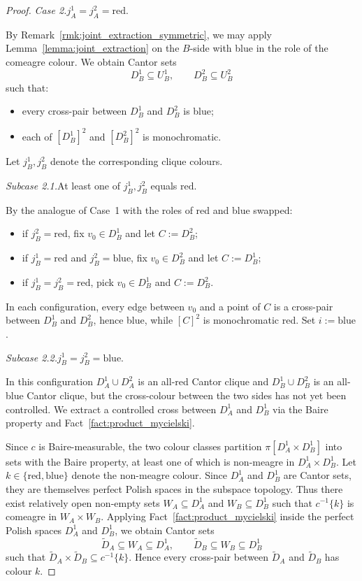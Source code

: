 \begin{proof}
    \medskip\noindent\textit{Case 2.}\quad $j_A^1=j_A^2=\mathrm{red}$.
    
    By Remark~\ref{rmk:joint_extraction_symmetric}, we may apply Lemma~\ref{lemma:joint_extraction} on the $B$-side with blue in the role of the comeagre colour.
    We obtain Cantor sets $$D_B^1\subseteq U_B^1,\qquad D_B^2\subseteq U_B^2$$ such that:
    \begin{itemize}
        \item every cross-pair between $D_B^1$ and $D_B^2$ is blue;
        \item each of $[D_B^1]^2$ and $[D_B^2]^2$ is monochromatic.
    \end{itemize}
    Let $j_B^1,j_B^2$ denote the corresponding clique colours.
    
    \medskip\noindent\textit{Subcase 2.1.}\quad At least one of $j_B^1,j_B^2$ equals $\mathrm{red}$.
    
    By the analogue of Case~1 with the roles of red and blue swapped:
    \begin{itemize}
        \item if $j_B^2=\mathrm{red}$, fix $v_0\in D_B^1$ and let $C:=D_B^2$;
        \item if $j_B^1=\mathrm{red}$ and $j_B^2=\mathrm{blue}$, fix $v_0\in D_B^2$ and let $C:=D_B^1$;
        \item if $j_B^1=j_B^2=\mathrm{red}$, pick $v_0\in D_B^1$ and $C:=D_B^2$.
    \end{itemize}
    In each configuration, every edge between $v_0$ and a point of $C$ is a cross-pair between $D_B^1$ and $D_B^2$, hence blue, while $[C]^2$ is monochromatic red.
    Set $i:=\mathrm{blue}$.
 
    \medskip\noindent\textit{Subcase 2.2.}\quad $j_B^1=j_B^2=\mathrm{blue}$.
    
    In this configuration $D_A^1\cup D_A^2$ is an all-red Cantor clique and $D_B^1\cup D_B^2$ is an all-blue Cantor clique, but the cross-colour between the two sides has not yet been controlled.
    We extract a controlled cross between $D_A^1$ and $D_B^1$ via the Baire property and Fact~\ref{fact:product_mycielski}.
 
    Since $c$ is Baire-measurable, the two colour classes partition $\pi[D_A^1\times D_B^1]$ into sets with the Baire property, at least one of which is non-meagre in $D_A^1\times D_B^1$.
    Let $k\in\{\mathrm{red},\mathrm{blue}\}$ denote the non-meagre colour.
    Since $D_A^1$ and $D_B^1$ are Cantor sets, they are themselves perfect Polish spaces in the subspace topology.
    Thus there exist relatively open non-empty sets $W_A\subseteq D_A^1$ and $W_B\subseteq D_B^1$ such that $c^{-1}\{k\}$ is comeagre in $W_A\times W_B$.
    Applying Fact~\ref{fact:product_mycielski} inside the perfect Polish spaces $D_A^1$ and $D_B^1$, we obtain Cantor sets $$\widetilde D_A\subseteq W_A\subseteq D_A^1,\qquad\widetilde D_B\subseteq W_B\subseteq D_B^1$$ such that $\widetilde D_A\times\widetilde D_B\subseteq c^{-1}\{k\}$.
    Hence every cross-pair between $\widetilde D_A$ and $\widetilde D_B$ has colour $k$.
 

\end{proof}

